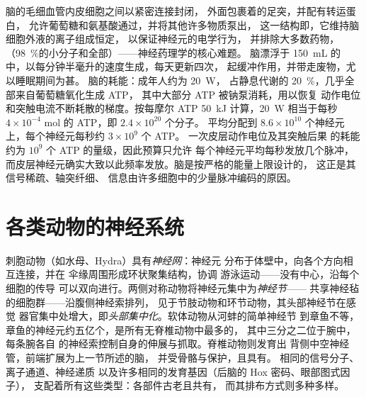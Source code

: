 \begin{proposition}[血脑屏障与脑的能量预算]\label{prop:b3:nervous-systems:barrier-budget}
脑的毛细血管内皮细胞之间以紧密连接封闭，
外面包裹着的足突，并配有转运蛋白，
允许葡萄糖和氨基酸通过，并将其他许多物质泵出，
这一结构即\emph{}，它维持脑细胞外液的离子组成恒定，
以保证神经元的电学行为，
并排除大多数药物，
（\qty{98}{\%}的小分子和全部）——神经药理学的核心难题。
脑漂浮于 \qty{150}{mL} 的
\emph{}中，以每分钟半毫升的速度生成，每天更新四次，
起缓冲作用，并带走废物，尤以睡眠期间为甚。
脑的耗能：成年人约为 \qty{20}{W}，
占静息代谢的 \qty{20}{\%}，几乎全部来自葡萄糖氧化生成 ATP，
其中大部分 ATP 被钠泵消耗，用以恢复
动作电位和突触电流不断耗散的梯度。按每摩尔 ATP
\qty{50}{kJ} 计算，\qty{20}{W} 相当于每秒 $4\times 10^{-4}$ mol
的 ATP，即 $2.4\times 10^{20}$ 个分子。
平均分配到 $8.6\times 10^{10}$ 个神经元上，每个神经元每秒约 $3\times 10^{9}$ 个 ATP。
一次皮层动作电位及其突触后果
的耗能约为 $10^{9}$ 个 ATP 的量级，因此预算只允许
每个神经元平均每秒发放几个脉冲，
而皮层神经元确实大致以此频率发放。脑是按严格的能量上限设计的，
这正是其信号稀疏、轴突纤细、
信息由许多细胞中的少量脉冲编码的原因。
\end{proposition}
\admitted

\section{各类动物的神经系统}

\begin{definition}\label{def:b3:nervous-systems:comparative}
刺胞动物（如水母、Hydra）具有\emph{神经网}：神经元
分布于体壁中，向各个方向相互连接，并在
伞缘周围形成环状聚集结构，协调
游泳运动——没有中心，沿每个细胞的传导
可以双向进行。两侧对称动物将神经元集中为\emph{神经节}——
共享神经毡的细胞群——沿腹侧神经索排列，
见于节肢动物和环节动物，其头部神经节在感觉
器官集中处增大，即\emph{头部集中化}。软体动物从河蚌的简单神经节
到章鱼不等，章鱼的神经元约五亿个，是所有无脊椎动物中最多的，
其中三分之二位于腕中，每条腕各自
的神经索控制自身的伸展与抓取。脊椎动物则发育出
背侧中空神经管，前端扩展为上一节所述的脑，
并受骨骼与保护，且具有。
相同的信号分子、离子通道、神经递质
以及许多相同的发育基因（后脑的 Hox 密码、眼部图式因子），
支配着所有这些类型：各部件古老且共有，
而其排布方式则多种多样。
\end{definition}

